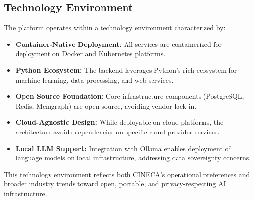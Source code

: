 \subsection{Technology Environment}

The platform operates within a technology environment characterized by:

\begin{itemize}
    \item \textbf{Container-Native Deployment:} All services are containerized for deployment on Docker and Kubernetes platforms.
    
    \item \textbf{Python Ecosystem:} The backend leverages Python's rich ecosystem for machine learning, data processing, and web services.
    
    \item \textbf{Open Source Foundation:} Core infrastructure components (PostgreSQL, Redis, Memgraph) are open-source, avoiding vendor lock-in.
    
    \item \textbf{Cloud-Agnostic Design:} While deployable on cloud platforms, the architecture avoids dependencies on specific cloud provider services.
    
    \item \textbf{Local LLM Support:} Integration with Ollama enables deployment of language models on local infrastructure, addressing data sovereignty concerns.
\end{itemize}

This technology environment reflects both CINECA's operational preferences and broader industry trends toward open, portable, and privacy-respecting AI infrastructure.

